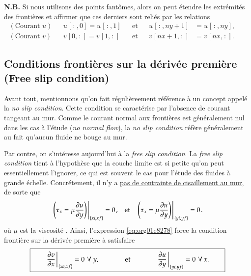 \documentclass[10pt]{article}
\numberwithin{equation}{section}
\newcommand{\bigno}{\vphantom{\qty(\frac{d}{q})}}
\newcommand{\pt}{\hspace{1pt}}
\begin{document}
\textbf{N.B.} Si nous utilisons des points fantômes, alors on peut étendre les extrémités des frontières et affirmer que ces derniers sont reliés par les relations
\begin{subequations}
\begin{align}
(\text{Courant }u) &&  u\pt[\pt:\pt,0] = u\pt[\pt:\pt,1] && \text{et} && u\pt[\pt:\pt,ny+1] &= u\pt[\pt:\pt,ny],&&\\
(\text{Courant }v) &&  v\pt[0,\pt:\pt] = v\pt[1,\pt:\pt] && \text{et} && v\pt[nx+1,\pt:\pt] &= v\pt[nx,\pt:\pt].&&
\end{align}
\end{subequations}

\subsection{Conditions frontières sur la dérivée première (Free slip condition)}
\label{sec:orgdddcc99}
Avant tout, mentionnons qu'on fait régulièreement référence à un concept appelé la \emph{no slip condition}.
Cette condition se caractérise par l'absence de courant tangeant au mur.
Comme le courant normal aux frontières est généralement nul dans les cas à l'étude (\emph{no normal flow}), la \emph{no slip condition} réfère généralement au fait qu'aucun fluide ne bouge au mur.\bigskip

Par contre, on s'intéresse aujourd'hui à la \emph{free slip condition}.
La \emph{free slip condition} tient à l'hypothèse que la couche limite est si petite qu'on peut essentiellement l'ignorer, ce qui est souvent le cas pour l'étude des fluides à grande échelle.
Concrétement, il n'y a \href{https://physics.stackexchange.com/questions/383096/understanding-free-slip-boundary-condition\#:\~:text=On\%20the\%20other\%20hand\%2C\%20the,the\%20tangential\%20component\%20is\%20unrestricted.}{pas de contrainte de cisaillement au mur}, de sorte que
\begin{align}
\label{eq:org01e8278}
&&\eval{\qty(\boldsymbol{\tau}_x = \mu \pdv{u}{y})\pt }_{\pt\{xi,xf\}} = 0\pt, && \text{et} &&
  \eval{\qty(\boldsymbol{\tau}_x = \mu \pdv{u}{y})\pt }_{\pt\{yi,yf\}} = 0\pt. &&
\end{align}
où \(\mu\) est la viscosité \citep{tan2018applying}.
Ainsi, l'expression \ref{eq:org01e8278} force la condition frontière sur la dérivée première à satisfaire 
\begin{equation}
\boxed{\hspace{0.7cm}\eval{\pdv{v}{x}\pt }_{\pt\{xa,xf\}} = 0\pt\ \forall\ y,\hspace{1.3cm} \text{et} \hspace{1.3cm} \eval{\pdv{u}{y}\pt }_{\pt \{yi,yf\}} = 0\pt\ \forall\ x.\hspace{0.7cm}\bigno}
\end{equation}
\end{document}
